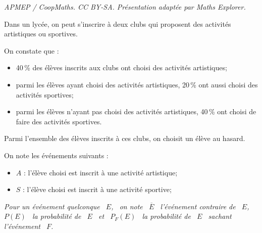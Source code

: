 \documentclass[10pt]{article}
\begin{document}
\noindent\textit{APMEP / CoopMaths. CC BY-SA. Présentation adaptée par Maths Explorer.}\par\medskip
Dans un lycée, on peut s'inscrire à deux clubs qui proposent des activités artistiques ou sportives.

On constate que :
\begin{itemize}[label=$\bullet$]
	\item 40\,\% des élèves inscrits aux clubs ont choisi des activités artistiques;
	\item parmi les élèves ayant choisi des activités artistiques, 20\,\% ont aussi choisi des activités sportives;
	\item parmi les élèves n'ayant pas choisi des activités artistiques, 40\,\% ont choisi de faire des activités sportives.
\end{itemize}

Parmi l'ensemble des élèves inscrits à ces clubs, on choisit un élève au hasard.

On note les événements suivants :

\begin{itemize}[label=$\bullet$]
	\item $A$ : \og{}l'élève choisi est inscrit à une activité artistique\fg{};
	
	\item $S$ :  \og{}l'élève choisi est inscrit à une activité sportive\fg{};
\end{itemize}

\emph{Pour un événement quelconque ~$E$,~ on note ~$\overline{E}$~ l'événement contraire de ~$E$,~ $P(E)$~ la probabilité de ~$E$~ et ~$P_F (E)$~ la probabilité de ~$E$~ sachant l'événement ~$F$.}
\end{document}
